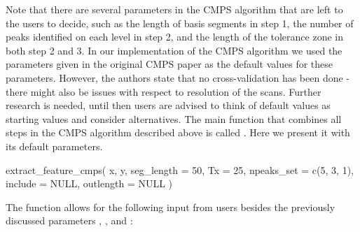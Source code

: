 Note that there are several parameters in the CMPS algorithm that
 are left to the users to decide,
such as the length of basis segments  in step 1, the
number of peaks  identified on each level in step 2,
and the length of the tolerance zone  in both step 2 and 3. In
our implementation of the CMPS algorithm we used the parameters given in
the original CMPS paper \citep{cmps} as the default values for these
parameters. However, the authors state that no cross-validation has been
done - there might also be issues with respect to resolution of the
scans. Further research is needed, until then users are advised to think
of default values as starting values and consider alternatives.
The main function that combines all steps in the CMPS algorithm
described above is called . Here we
present it with its default parameters.

\begin{Schunk}
\begin{Sinput}
extract_feature_cmps(
  x,
  y,
  seg_length = 50,
  Tx = 25,
  npeaks_set = c(5, 3, 1),
  include = NULL,
  outlength = NULL
)
\end{Sinput}
\end{Schunk}

The function  allows for the following
input from users besides the previously discussed parameters
, , and :

